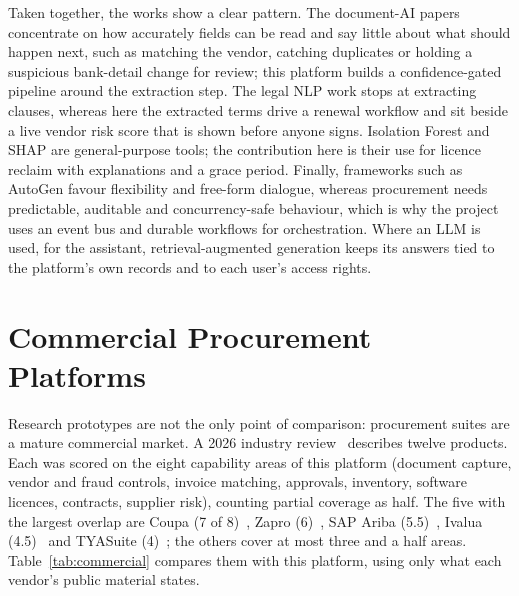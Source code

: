 Taken together, the works show a clear pattern. The document-AI papers concentrate on how accurately fields can be read and say little about what should happen next, such as matching the vendor, catching duplicates or holding a suspicious bank-detail change for review; this platform builds a confidence-gated pipeline around the extraction step. The legal NLP work stops at extracting clauses, whereas here the extracted terms drive a renewal workflow and sit beside a live vendor risk score that is shown before anyone signs. Isolation Forest and SHAP are general-purpose tools; the contribution here is their use for licence reclaim with explanations and a grace period. Finally, frameworks such as AutoGen favour flexibility and free-form dialogue, whereas procurement needs predictable, auditable and concurrency-safe behaviour, which is why the project uses an event bus and durable workflows for orchestration. Where an LLM is used, for the assistant, retrieval-augmented generation keeps its answers tied to the platform's own records and to each user's access rights.

\section{Commercial Procurement Platforms}\label{sec:commercial}
Research prototypes are not the only point of comparison: procurement suites are a mature commercial market. A 2026 industry review~\cite{scry2026best} describes twelve products. Each was scored on the eight capability areas of this platform (document capture, vendor and fraud controls, invoice matching, approvals, inventory, software licences, contracts, supplier risk), counting partial coverage as half. The five with the largest overlap are Coupa (7 of 8)~\cite{coupa2026release,coupa2026demo}, Zapro (6)~\cite{zapro2026}, SAP Ariba (5.5)~\cite{sap2026ariba}, Ivalua (4.5)~\cite{scry2026best} and TYASuite (4)~\cite{tyasuite2026}; the others cover at most three and a half areas. Table~\ref{tab:commercial} compares them with this platform, using only what each vendor's public material states.

